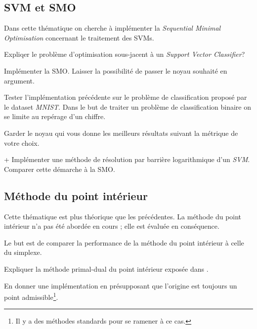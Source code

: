 \documentclass[11pt, a4paper]{article}
\begin{document}
\subsection{SVM et SMO}

Dans cette thématique on cherche à implémenter la \emph{Sequential
  Minimal Optimisation} concernant le traitement des SVMs.

\begin{question}
  Expliqer le problème d'optimisation sous-jacent à un \emph{Support
    Vector Classifier}?
\end{question}

\begin{question}
  Implémenter la SMO. Laisser la possibilité de passer le noyau
  souhaité en argument.
\end{question}

\begin{question}
  Tester l'implémentation précédente sur le problème de classification
  proposé par le dataset \emph{MNIST}. Dans le but de traiter un
  problème de classification binaire on se limite au repérage d'un
  chiffre.

  \noindent Garder le noyau qui vous donne les meilleurs résultats
  suivant la métrique de votre choix.
\end{question}

\begin{question}{+}
  Implémenter une méthode de résolution par barrière logarithmique
  d'un \emph{SVM}. Comparer cette démarche à la SMO.
\end{question}

\subsection{Méthode du point intérieur}

Cette thématique est plus théorique que les précédentes. La méthode du
point intérieur n'a pas été abordée en cours ; elle est évaluée en
conséquence.

Le but est de comparer la performance de la méthode du point intérieur
à celle du simplexe.

\begin{question}{4}
  Expliquer la méthode primal-dual du point intérieur exposée
  dans \cite[11.7]{Boyd:2004:CO:993483}.
\end{question}

\begin{question}{6}
  En donner une implémentation en présupposant que l'origine est
  toujours un point admissible\footnote{Il y a des méthodes standards
    pour se ramener à ce cas.}.
\end{question}
\end{document}
